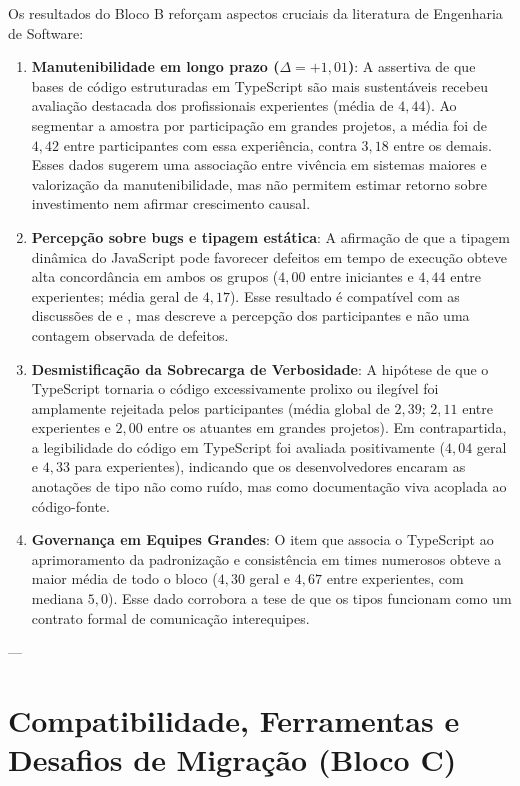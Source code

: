 Os resultados do Bloco B reforçam aspectos cruciais da literatura de Engenharia de Software:

\begin{enumerate}
    \item \textbf{Manutenibilidade em longo prazo ($\Delta = +1,01$)}: A assertiva de que bases de código estruturadas em TypeScript são mais sustentáveis recebeu avaliação destacada dos profissionais experientes (média de $4,44$). Ao segmentar a amostra por participação em grandes projetos, a média foi de $4,42$ entre participantes com essa experiência, contra $3,18$ entre os demais. Esses dados sugerem uma associação entre vivência em sistemas maiores e valorização da manutenibilidade, mas não permitem estimar retorno sobre investimento nem afirmar crescimento causal.
    
    \item \textbf{Percepção sobre bugs e tipagem estática}: A afirmação de que a tipagem dinâmica do JavaScript pode favorecer defeitos em tempo de execução obteve alta concordância em ambos os grupos ($4,00$ entre iniciantes e $4,44$ entre experientes; média geral de $4,17$). Esse resultado é compatível com as discussões de \cite{bogner2022} e \cite{george2020}, mas descreve a percepção dos participantes e não uma contagem observada de defeitos.
    
    \item \textbf{Desmistificação da Sobrecarga de Verbosidade}: A hipótese de que o TypeScript tornaria o código excessivamente prolixo ou ilegível foi amplamente rejeitada pelos participantes (média global de $2,39$; $2,11$ entre experientes e $2,00$ entre os atuantes em grandes projetos). Em contrapartida, a legibilidade do código em TypeScript foi avaliada positivamente ($4,04$ geral e $4,33$ para experientes), indicando que os desenvolvedores encaram as anotações de tipo não como ruído, mas como documentação viva acoplada ao código-fonte.
    
    \item \textbf{Governança em Equipes Grandes}: O item que associa o TypeScript ao aprimoramento da padronização e consistência em times numerosos obteve a maior média de todo o bloco ($4,30$ geral e $4,67$ entre experientes, com mediana $5,0$). Esse dado corrobora a tese de que os tipos funcionam como um contrato formal de comunicação interequipes.
\end{enumerate}

---

\section{Compatibilidade, Ferramentas e Desafios de Migração (Bloco C)}
\label{sec:compatibilidade}

